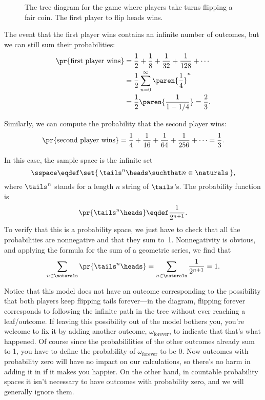 \begin{figure}


\caption{The tree diagram for the game where players take turns
  flipping a fair coin.  The first player to flip heads wins.}

\label{fig:14A15}

\end{figure}

The event that the first player wins contains an infinite number of
outcomes, but we can still sum their probabilities:
\begin{align*}
\pr{\text{first player wins}}
    & = \frac{1}{2} + \frac{1}{8} + \frac{1}{32} + \frac{1}{128} + \cdots \\
    & = \frac{1}{2} \sum_{n=0}^\infty \paren{\frac{1}{4}}^n \\
    & = \frac{1}{2}\paren{\frac{1}{1-1/4}} = \frac{2}{3}.
\end{align*}

Similarly, we can compute the probability that the second player wins:
\begin{align*}
\pr{\text{second player wins}}
     = \frac{1}{4} + \frac{1}{16} + \frac{1}{64} + \frac{1}{256}
                      + \cdots %
     = \frac{1}{3}.
\end{align*}

In this case, the sample space is the infinite set
\[
    \sspace \eqdef \set{\, \tails^n\heads \suchthat n \in \naturals \,},
\]
where $\tails^n$ stands for a length $n$ string of $\tails$'s.
The probability function is
\[
\pr{\tails^n\heads} \eqdef \frac{1}{2^{n+1}}.
\]
To verify that this is a probability space, we just have to check that
all the probabilities are nonnegative and that they sum to~1.
Nonnegativity is obvious, and applying the formula for the sum of a
geometric series, we find that
\begin{equation*}
\sum_{n \in \naturals} \pr{\tails^n\heads}
    = \sum_{n \in \naturals} \frac{1}{2^{n+1}} \\
    = 1.
\end{equation*}

Notice that this model does not have an outcome corresponding to the
possibility that both players keep flipping tails forever---in the
diagram, flipping forever corresponds to following the infinite path
in the tree without ever reaching a leaf/outcome.  If leaving this
possibility out of the model bothers you, you're welcome to fix it by
adding another outcome, $\omega_{\text{forever}}$, to indicate that that's
what happened.  Of course since the probabililities of the other
outcomes already sum to 1, you have to define the probability of
$\omega_{\text{forever}}$ to be 0.  Now outcomes with probability zero will
have no impact on our calculations, so there's no harm in adding it in
if it makes you happier.  On the other hand, in countable probability
spaces it isn't necessary to have outcomes with probability zero, and
we will generally ignore them.

